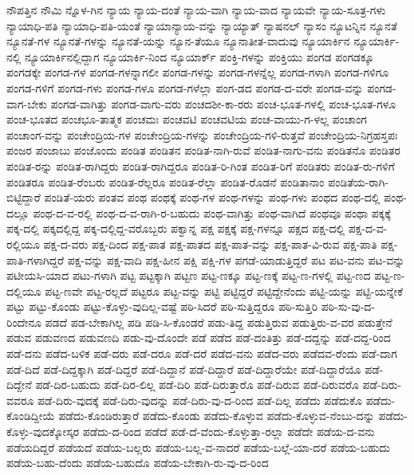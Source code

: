 {ನೌಪತ್ತಿನ
ನೌಮಿ
ನ್ನೊಳ-ಗಿನ
ನ್ಯಾಯ
ನ್ಯಾಯ-ದಂತೆ
ನ್ಯಾಯ-ವಾಗಿ
ನ್ಯಾಯ-ವಾದ
ನ್ಯಾಯವೇ
ನ್ಯಾಯ-ಸೂತ್ರ-ಗಳು
ನ್ಯಾಯಾಧಿ-ಪತಿ
ನ್ಯಾಯಾಧಿ-ಪತಿ-ಯಂತೆ
ನ್ಯಾಯಾನ್ಯಾಯ-ವನ್ನು
ನ್ಯಾಯ್ಯಾತ್
ನ್ಯಾಷನಲ್
ನ್ಯಾಸಂ
ನ್ಯೂಟನ್ನಿನ
ನ್ಯೂನತೆ
ನ್ಯೂನತೆ-ಗಳ
ನ್ಯೂನತೆ-ಗಳನ್ನು
ನ್ಯೂನತೆ-ಯನ್ನು
ನ್ಯೂನ-ತೆಯೂ
ನ್ಯೂನಾತೀತ-ವಾದುವು
ನ್ಯೂಯಾರ್ಕಿನ
ನ್ಯೂಯಾರ್ಕಿ-ನಲ್ಲಿ
ನ್ಯೂಯಾರ್ಕಿನಲ್ಲಿದ್ದಾಗ
ನ್ಯೂಯಾರ್ಕಿ-ನಿಂದ
ನ್ಯೂಯಾರ್ಕ್
ಪಂಕ್ತಿ-ಗಳನ್ನು
ಪಂಕ್ತಿಯು
ಪಂಗಡ
ಪಂಗಡಕ್ಕೂ
ಪಂಗಡಕ್ಕೇ
ಪಂಗಡ-ಗಳ
ಪಂಗಡ-ಗಳನ್ನಾಗಲೀ
ಪಂಗಡ-ಗಳನ್ನು
ಪಂಗಡ-ಗಳನ್ನೆಲ್ಲ
ಪಂಗಡ-ಗಳಾಗಿ
ಪಂಗಡ-ಗಳಿಗೂ
ಪಂಗಡ-ಗಳಿಗೆ
ಪಂಗಡ-ಗಳು
ಪಂಗಡ-ಗಳೂ
ಪಂಗಡ-ಗಳೆಲ್ಲಾ
ಪಂಗ-ಡದ
ಪಂಗಡ-ದ-ವರೇ
ಪಂಗಡ-ವನ್ನು
ಪಂಗಡ-ವಾಗ-ಬೇಕು
ಪಂಗಡ-ವಾಗಿತ್ತು
ಪಂಗಡ-ವಾಗು-ವರು
ಪಂಚದಶೀ-ಕಾ-ರರು
ಪಂಚ-ಭೂತ-ಗಳಲ್ಲಿ
ಪಂಚ-ಭೂತ-ಗಳೂ
ಪಂಚ-ಭೂತದ
ಪಂಚಭೂ-ತಾತ್ಮಕ
ಪಂಚಮಃ
ಪಂಚವಟಿ
ಪಂಚವಟಿಯ
ಪಂಚ-ವಾಯು-ಗ-ಳಲ್ಲ
ಪಂಚಾಂಗ
ಪಂಚಾಂಗ-ವನ್ನು
ಪಂಚೇಂದ್ರಿಯ-ಗಳ
ಪಂಚೇಂದ್ರಿಯ-ಗಳನ್ನು
ಪಂಚೇಂದ್ರಿಯ-ಗಳಿ-ರುತ್ತವೆ
ಪಂಚೇಂದ್ರಿಯ-ನಿಗ್ರಹಸ್ತಪಃ
ಪಂಜರ
ಪಂಜಾಬು
ಪಂಜೊಂದು
ಪಂಡಿತ
ಪಂಡಿತನ
ಪಂಡಿತ-ನಾಗಿ-ರುವೆ
ಪಂಡಿತ-ನಾಗು-ವನು
ಪಂಡಿತನೊ
ಪಂಡಿತರ
ಪಂಡಿತ-ರನ್ನು
ಪಂಡಿತ-ರಾಗಿದ್ದರು
ಪಂಡಿತ-ರಾಗಿದ್ದರೂ
ಪಂಡಿತ-ರಿ-ಗಿಂತ
ಪಂಡಿತ-ರಿಗೆ
ಪಂಡಿತರು
ಪಂಡಿತ-ರು-ಗಳಿಗೆ
ಪಂಡಿತರೂ
ಪಂಡಿತ-ರೆಂಬರು
ಪಂಡಿತ-ರೆಲ್ಲರೂ
ಪಂಡಿತ-ರೆಲ್ಲಾ
ಪಂಡಿತ-ರೊಡನೆ
ಪಂಡಿತಾನಾಂ
ಪಂಡಿತೆಯ-ರಾಗಿ-ಬಿಟ್ಟಿದ್ದಾರೆ
ಪಂಡಿತೆ-ಯರು
ಪಂತವ
ಪಂಥ
ಪಂಥಕ್ಕೆ
ಪಂಥ-ಗಳ
ಪಂಥ-ಗಳನ್ನು
ಪಂಥ-ಗಳು
ಪಂಥದ
ಪಂಥ-ದಲ್ಲಿ
ಪಂಥ-ದಲ್ಲೂ
ಪಂಥ-ದ-ವ-ರಲ್ಲಿ
ಪಂಥ-ದ-ವ-ರಾಗಿ-ರ-ಬಹುದು
ಪಂಥ-ವಾಗಿತ್ತು
ಪಂಥ-ವಾಗಿದೆ
ಪಂಥವೂ
ಪಂಥಾ
ಪಕ್ಕಕ್ಕೆ
ಪಕ್ಕ-ದಲ್ಲಿ
ಪಕ್ಕದಲ್ಲಿದ್ದ
ಪಕ್ಕ-ದಲ್ಲಿದ್ದ-ವರೊಬ್ಬರು
ಪಕ್ವಾನ್ನ
ಪಕ್ಷ
ಪಕ್ಷಕ್ಕೆ
ಪಕ್ಷ-ಗಳನ್ನೂ
ಪಕ್ಷದ
ಪಕ್ಷ-ದಲ್ಲಿ
ಪಕ್ಷ-ದ-ವ-ರಲ್ಲಿಯೂ
ಪಕ್ಷ-ದ-ವರು
ಪಕ್ಷ-ದಿಂದ
ಪಕ್ಷ-ಪಾತ
ಪಕ್ಷ-ಪಾತದ
ಪಕ್ಷ-ಪಾತ-ವನ್ನು
ಪಕ್ಷ-ಪಾತ-ವಿ-ರುವ
ಪಕ್ಷ-ಪಾತಿ
ಪಕ್ಷ-ಪಾತಿ-ಗಳಾಗಿದ್ದರೆ
ಪಕ್ಷ-ವನ್ನು
ಪಕ್ಷ-ವಾದಿ
ಪಕ್ಷ-ಹೀನ
ಪಕ್ಷಿ
ಪಕ್ಷಿ-ಗಳ
ಪಗಡೆ-ಯಾಡುತ್ತಿದ್ದರೆ
ಪಟ
ಪಟ-ವನು
ಪಟ-ವನ್ನು
ಪಟೀಯಸಿ-ಯಾದ
ಪಟು-ಗಳಾಗಿ
ಪಟ್ಟ
ಪಟ್ಟಕ್ಕಾಗಿ
ಪಟ್ಟಣ
ಪಟ್ಟ-ಣಕ್ಕೂ
ಪಟ್ಟ-ಣಕ್ಕೆ
ಪಟ್ಟ-ಣ-ಗಳಲ್ಲಿ
ಪಟ್ಟ-ಣದ
ಪಟ್ಟ-ಣ-ದಲ್ಲಿಯೂ
ಪಟ್ಟ-ಣವೇ
ಪಟ್ಟ-ರಲ್ಲದೆ
ಪಟ್ಟರೂ
ಪಟ್ಟ-ವನ್ನು
ಪಟ್ಟಿ
ಪಟ್ಟಿದ್ದರೆ
ಪಟ್ಟಿದ್ದೇನೆಂದು
ಪಟ್ಟಿ-ಯನ್ನು
ಪಟ್ಟಿ-ಯನ್ನೇಕೆ
ಪಟ್ಟು
ಪಟ್ಟು-ಕೊಂಡು
ಪಟ್ಟು-ಕೊಳ್ಳು-ವುದಿಲ್ಲ-ವಷ್ಟೆ
ಪಠಿ-ಸಿದರೆ
ಪಠಿ-ಸುತ್ತಿದ್ದರೂ
ಪಠಿ-ಸುತ್ತಿರಿ
ಪಠಿ-ಸು-ವು-ದ-ರಿಂದೇನೂ
ಪಡದೆ
ಪಡ-ಬೇಕಾಗಿಲ್ಲ
ಪಡಿ
ಪಡಿ-ಸಿ-ಕೊಂಡರೆ
ಪಡು-ತಿದ್ದ
ಪಡುತ್ತಿರುವ
ಪಡುತ್ತಿರು-ವ-ವರ
ಪಡುತ್ತೇನೆ
ಪಡುವ
ಪಡುವಣದ
ಪಡುವಣದಿ
ಪಡು-ವು-ದೊಂದೇ
ಪಡೆ
ಪಡೆದ
ಪಡೆ-ದಂತಿತ್ತು
ಪಡೆ-ದದ್ದನ್ನು
ಪಡೆ-ದದ್ದ-ರಿಂದ
ಪಡೆ-ದನು
ಪಡೆದ-ಬಳಿಕ
ಪಡೆ-ದರು
ಪಡೆ-ದರೂ
ಪಡೆ-ದರೆ
ಪಡೆದ-ವನು
ಪಡೆದ-ವರು
ಪಡೆದವ-ರೆಂದು
ಪಡೆ-ದಾಗ
ಪಡೆ-ದಿದೆ
ಪಡೆ-ದಿದ್ದಕ್ಕಾಗಿ
ಪಡೆ-ದಿದ್ದರೆ
ಪಡೆ-ದಿದ್ದಾನೆ
ಪಡೆ-ದಿದ್ದಾರೆ
ಪಡೆ-ದಿದ್ದಾರೆಯೇ
ಪಡೆ-ದಿದ್ದಾರೆಯೊ
ಪಡೆ-ದಿದ್ದೇನೆ
ಪಡೆ-ದಿರ-ಬಹುದು
ಪಡೆ-ದಿರ-ಲಿಲ್ಲ
ಪಡೆ-ದಿರಿ
ಪಡೆ-ದಿರುತ್ತಾರೊ
ಪಡೆ-ದಿರುವ
ಪಡೆ-ದಿರುವರೊ
ಪಡೆ-ದಿರು-ವವರೂ
ಪಡೆ-ದಿರು-ವುದಕ್ಕೆ
ಪಡೆ-ದಿರು-ವುದನ್ನು
ಪಡೆ-ದಿರು-ವು-ದ-ರಿಂದ
ಪಡೆ-ದಿಲ್ಲ
ಪಡೆದು
ಪಡೆದುಕೊ
ಪಡೆದು-ಕೊಂಡಿದ್ದೀಯೆ
ಪಡೆದು-ಕೊಂಡಿರುತ್ತಾರೆ
ಪಡೆದು-ಕೊಂಡು
ಪಡೆದು-ಕೊಳ್ಳುವ
ಪಡೆದು-ಕೊಳ್ಳುವ-ನೆಂಬು-ದನ್ನು
ಪಡೆದು-ಕೊಳ್ಳು-ವುದಕ್ಕೋಸ್ಕರ
ಪಡೆದು-ದ-ರಿಂದ
ಪಡೆದೆ
ಪಡೆ-ದೆ-ವೆಂದು-ಕೊಳ್ಳುತ್ತಾ-ರಲ್ಲಾ
ಪಡೆದೇ
ಪಡೆಯ-ದ-ವನು
ಪಡೆಯದಿದ್ದರೆ
ಪಡೆಯದೆ
ಪಡೆಯ-ಬಲ್ಲರು
ಪಡೆಯ-ಬಲ್ಲ-ವ-ನಾದರೆ
ಪಡೆಯ-ಬಲ್ಲೆ-ಯಾ-ದರೆ
ಪಡೆಯ-ಬಹುದು
ಪಡೆಯ-ಬಹು-ದೆಂದು
ಪಡೆಯ-ಬಹುದೊ
ಪಡೆಯ-ಬೇಕಾಗಿ-ರು-ವು-ದ-ರಿಂದ
}
